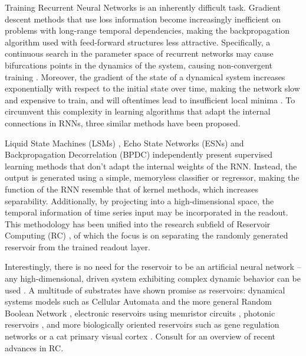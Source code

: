 Training Recurrent Neural Networks is an inherently difficult task. Gradient
descent methods that use loss information become increasingly inefficient on
problems with long-range temporal dependencies, making the backpropagation
algorithm used with feed-forward structures less attractive. Specifically, a
continuous search in the parameter space of recurrent networks may cause
bifurcations points in the dynamics of the system, causing non-convergent
training \cite{doya_bifurcations_nodate}. Moreover, the gradient of the state of
a dynamical system increases exponentially with respect to the initial state
over time, making the network slow and expensive to train, and will oftentimes
lead to insufficient local minima \cite{bengio_learning_1994}. To circumvent
this complexity in learning algorithms that adapt the internal connections in
RNNs, three similar methods have been proposed.

Liquid State Machines (LSMs) \cite{maass_real-time_2002}, Echo State Networks
(ESNs) \cite{jaeger_echo_2001} and Backpropagation Decorrelation (BPDC)
\cite{steil_backpropagation-decorrelation:_2004} independently present
supervised learning methods that don't adapt the internal weights of the
RNN. Instead, the output is generated using a simple, memoryless classifier or
regressor, making the function of the RNN resemble that of kernel methods, which
increases separability. Additionally, by projecting into a high-dimensional
space, the temporal information of time series input may be incorporated in the
readout. This methodology has been unified into the research subfield of
Reservoir Computing (RC) \cite{schrauwen_overview_2007}, of which the focus is
on separating the randomly generated reservoir from the trained readout layer.

Interestingly, there is no need for the reservoir to be an artificial neural
network -- any high-dimensional, driven system exhibiting complex dynamic
behavior can be used \cite{schrauwen_overview_2007}. A multitude of substrates
have shown promise as reservoirs: dynamical systems models such as Cellular
Automata \cite{nichele_deep_2017} and the more general Random Boolean Network
\cite{snyder_computational_2013}, electronic reservoirs using memristor circuits
\cite{kulkarni_memristor-based_2012}, photonic reservoirs
\cite{vandoorne_experimental_2014}, and more biologically oriented reservoirs
such as gene regulation networks \cite{jones_is_2007} or a cat primary visual
cortex \cite{scholkopf_temporal_2007}. Consult \cite{tanaka_recent_2018} for an
overview of recent advances in RC.

